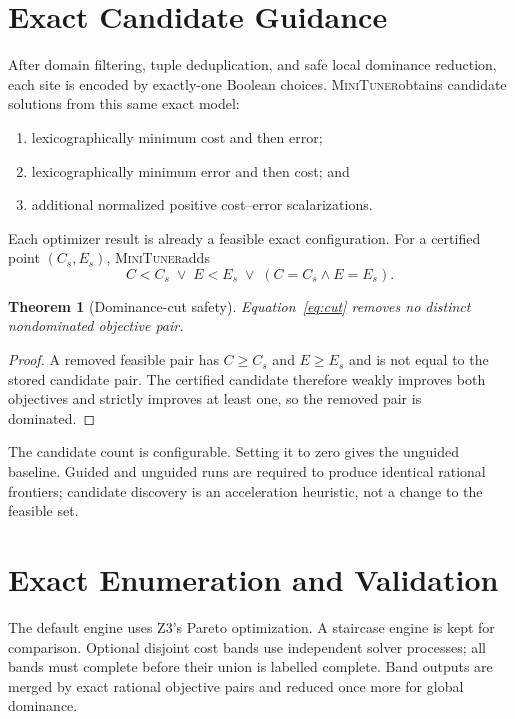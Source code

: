 \documentclass[10pt]{article}
\newcommand{\tool}{\textsc{MiniTuner}}
\newtheorem{theorem}{Theorem}
\begin{document}
\section{Exact Candidate Guidance}

After domain filtering, tuple deduplication, and safe local dominance
reduction, each site is encoded by exactly-one Boolean choices. \tool obtains
candidate solutions from this same exact model:
\begin{enumerate}[leftmargin=*]
 \item lexicographically minimum cost and then error;
 \item lexicographically minimum error and then cost; and
 \item additional normalized positive cost--error scalarizations.
\end{enumerate}
Each optimizer result is already a feasible exact configuration. For a
certified point $(C_s,E_s)$, \tool adds
\begin{equation}
 C<C_s\;\lor\;E<E_s\;\lor\;(C=C_s\land E=E_s).
 \label{eq:cut}
\end{equation}

\begin{theorem}[Dominance-cut safety]
Equation~\eqref{eq:cut} removes no distinct nondominated objective pair.
\end{theorem}
\begin{proof}
A removed feasible pair has $C\geq C_s$ and $E\geq E_s$ and is not equal to
the stored candidate pair. The certified candidate therefore weakly improves
both objectives and strictly improves at least one, so the removed pair is
dominated.
\end{proof}

The candidate count is configurable. Setting it to zero gives the unguided
baseline. Guided and unguided runs are required to produce identical rational
frontiers; candidate discovery is an acceleration heuristic, not a change to
the feasible set.

\section{Exact Enumeration and Validation}

The default engine uses Z3's Pareto optimization. A staircase engine is kept
for comparison. Optional disjoint cost bands use independent solver processes;
all bands must complete before their union is labelled complete. Band outputs
are merged by exact rational objective pairs and reduced once more for global
dominance.
\end{document}
